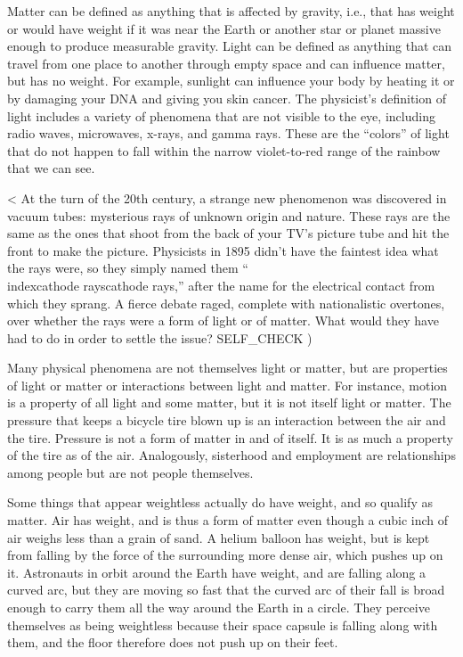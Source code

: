 Matter can be defined as anything that is
affected by gravity, i.e., that has weight or would have
weight if it was near the Earth or another star or planet
massive enough to produce measurable gravity. Light
can be defined as anything that can travel from one place to
another through empty space and can influence matter, but
has no weight. For example, sunlight can influence your body
by heating it or by damaging your DNA and giving you skin
cancer. The physicist's definition of light includes a
variety of phenomena that are not visible to the eye,
including radio waves, microwaves,
x-rays, and gamma rays.
These are the ``colors'' of light that do not happen to fall
within the narrow violet-to-red range of the rainbow that we can see.

<%
At the turn of the 20th century, a strange new phenomenon
was discovered in vacuum tubes: mysterious rays of unknown
origin and nature.  These rays are the same as the ones that
shoot from the back of your TV's picture tube and hit the
front to make the picture.  Physicists in 1895 didn't have
the faintest idea what the rays were, so they simply named
them ``\\index{cathode rays}cathode rays,'' after the name
for the electrical contact from which they sprang.  A fierce
debate raged, complete with nationalistic overtones, over
whether the rays were a form of light or of matter.  What
would they have had to do in order to settle the issue?
  SELF_CHECK
  ) %

Many physical phenomena are not themselves light or matter,
but are properties of light or matter or interactions
between light and matter. For instance, motion is a property
of all light and some matter, but it is not itself light or
matter. The pressure that keeps a bicycle tire blown up is
an interaction between the air and the tire. Pressure is not
a form of matter in and of itself. It is as much a property
of the tire as of the air. Analogously, sisterhood and
employment are relationships among people but are not people themselves.

Some things that appear weightless actually do have weight,
and so qualify as matter. Air has weight, and is thus a form
of matter even though a cubic inch of air weighs less than a
grain of sand. A helium balloon has weight, but is kept from
falling by the force of the surrounding more dense air,
which pushes up on it. Astronauts in orbit around the Earth
have weight, and are falling along a curved arc, but they
are moving so fast that the curved arc of their fall is
broad enough to carry them all the way around the Earth in a
circle. They perceive themselves as being weightless because
their space capsule is falling along with them, and the
floor therefore does not push up on their feet.

